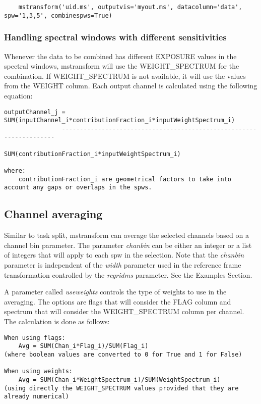\begin{verbatim}
    mstransform('uid.ms', outputvis='myout.ms', datacolumn='data', spw='1,3,5', combinespws=True)
\end{verbatim}

\subsubsection{Handling spectral windows with different sensitivities}
Whenever the data to be combined has different EXPOSURE values in the spectral
windows, mstransform will use the WEIGHT\_SPECTRUM for the combination. If
WEIGHT\_SPECTRUM is not available, it will use the values from the WEIGHT
column. Each output channel is calculated using the following equation:

\begin{verbatim}
outputChannel_j = SUM(inputChannel_i*contributionFraction_i*inputWeightSpectrum_i) 
                --------------------------------------------------------------------
                        SUM(contributionFraction_i*inputWeightSpectrum_i)

where:
    contributionFraction_i are geometrical factors to take into account any gaps or overlaps in the spws.
\end{verbatim}

\subsection{Channel averaging}
Similar to task split, mstransform can average the selected channels based on a
channel bin parameter. The parameter {\it chanbin} can be either an integer or a list of
integers that will apply to each spw in the selection. Note that the {\it chanbin}
parameter is independent of the {\it width} parameter used in the reference frame
transformation controlled by the {\it regridms} parameter. See the Examples Section.

A parameter called {\it useweights} controls the type of weights to use in the
averaging. The options are flags that will consider the FLAG column and spectrum
that will consider the WEIGHT_SPECTRUM column per channel. The calculation is
done as follows:

\begin{verbatim}
When using flags:
    Avg = SUM(Chan_i*Flag_i)/SUM(Flag_i)     
(where boolean values are converted to 0 for True and 1 for False)

When using weights:
    Avg = SUM(Chan_i*WeightSpectrum_i)/SUM(WeightSpectrum_i)     
(using directly the WEIGHT_SPECTRUM values provided that they are already numerical)

\end{verbatim}


